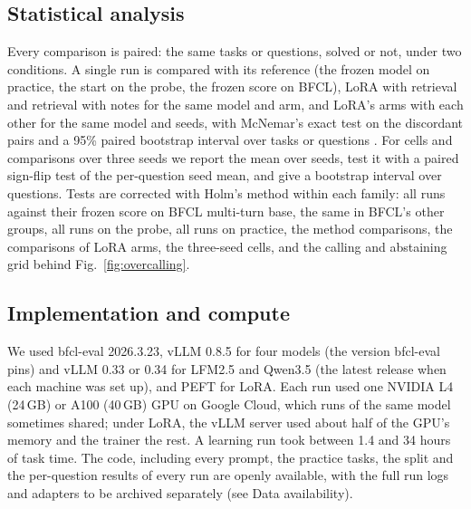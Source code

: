 \documentclass[a4paper,fleqn]{cas-dc}
\begin{document}
\subsection{Statistical analysis}\label{sec:stats}
Every comparison is paired: the same tasks or questions, solved or not, under two conditions. A single run is compared
with its reference (the frozen model on practice, the start on the probe, the frozen score on BFCL), LoRA with retrieval and retrieval with notes for the same model and arm, and LoRA's arms with each other for the same
model and seeds, with McNemar's exact test on the discordant pairs
\citep{mcnemar1947note,dietterich1998approximate} and a 95\% paired bootstrap interval over tasks or questions
\citep{efron1993introduction}. For cells and comparisons over three seeds we report the mean over seeds, test it with a paired sign-flip
test of the per-question seed mean, and give a bootstrap interval over questions. Tests are corrected with Holm's method
\citep{holm1979simple} within each family: all runs against their frozen score on BFCL multi-turn base, the same in BFCL's other
groups, all runs on the probe, all runs on practice, the method comparisons, the comparisons of LoRA arms, the three-seed cells, and the calling and abstaining grid behind
Fig.~\ref{fig:overcalling}.

\subsection{Implementation and compute}\label{sec:compute}
We used bfcl-eval 2026.3.23, vLLM 0.8.5 for four models (the version bfcl-eval pins) and vLLM 0.33 or
0.34 for LFM2.5 and Qwen3.5 (the latest release when each machine was set up), and PEFT \citep{mangrulkar2022peft} for LoRA. Each run used one NVIDIA L4 (24\,GB) or A100
(40\,GB) GPU on Google Cloud, which runs of the same model sometimes shared; under LoRA, the vLLM server used about half of the GPU's memory and the trainer
the rest. A learning run took between 1.4 and 34 hours of task time. The code, including every prompt, the practice tasks, the split and the per-question results of every run
are openly available, with the full run logs and adapters to be archived separately (see Data availability).

\end{document}
